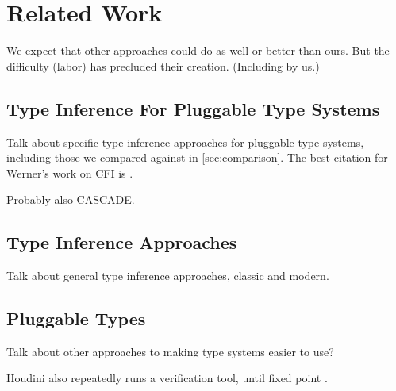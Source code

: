 \section{Related Work}
\label{sec:relatedwork}

We expect that other approaches could do as well or better than ours.  But
the difficulty (labor) has precluded their creation.  (Including by us.)


\subsection{Type Inference For Pluggable Type Systems}
\label{sec:rw:type-inference-pluggable}

Talk about specific type inference approaches for pluggable type systems, including those we
compared against in \cref{sec:comparison}. 
The best citation for Werner's work on CFI is \cite{XiangLD2020}.

Probably also CASCADE.

\subsection{Type Inference Approaches}
\label{sec:rw:type-inference}

Talk about general type inference approaches, classic and modern.

\subsection{Pluggable Types}
\label{sec:pluggable}

Talk about other approaches to making type systems easier to use?


Houdini also repeatedly runs a verification tool, until fixed point \cite{FlanaganJL01,FlanaganL2001:Houdini}.
